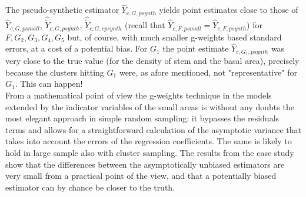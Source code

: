 \documentclass[a4paper,12pt,leqno, titlepage]{article}
\begin{document}
The pseudo-synthetic estimator $\hat{Y}_{c,G,psynth}$ yields point estimates close to those of
$\hat{Y}_{c,G,psmall}$, $\hat{\tilde{Y}}_{c,G,psynth}$, $\hat{\tilde{Y}}_{c,G,cpsynth}$ (recall that
$\hat{Y}_{c,F,psmall}=\hat{Y}_{c,F,psynth}$) for $F, G_2,G_3,G_4,G_5$ but, of course, with much smaller g-weights based standard errors, at a cost of a potential bias. For $G_1$ the point estimate $\hat{Y}_{c,G_1,psynth}$ was very close to the true value (for the density of stem and the basal area), precisely because the clusters hitting $G_1$ were, as afore mentioned, not "representative" for $G_1$. This can happen!\\
From a mathematical point of view the g-weights technique in the models extended by the indicator variables of the small areas is without any doubts the most elegant approach in simple random sampling: it bypasses the residuals terms and allows for a straightforward calculation of the asymptotic variance that takes into account the errors of the regression coefficients. The same is likely to hold in large sample also with cluster sampling. The results from the case study show that the differences between the asymptotically unbiased estimators are very small from a practical point of the view, and that a potentially biased estimator can by chance be closer to the truth.

\newpage
\end{document}
